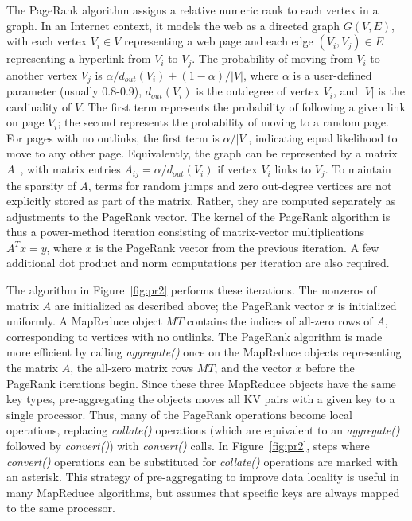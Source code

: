 The PageRank algorithm assigns a relative numeric rank to each vertex
in a graph.  In an Internet context, it models the web as a directed
graph $G(V,E)$, with each vertex $V_i \in V$ representing a web page
and each edge $(V_i, V_j) \in E$ representing a hyperlink from $V_i$
to $V_j$.  The probability of moving from $V_i$ to another vertex
$V_j$ is $\alpha/d_{out}(V_i) + (1-\alpha)/|V|$, where $\alpha$ is a
user-defined parameter (usually 0.8-0.9), $d_{out}(V_i)$ is the
outdegree of vertex $V_i$, and $|V|$ is the cardinality of $V$.  The
first term represents the probability of following a given link on
page $V_i$; the second represents the probability of moving to a
random page.  For pages with no outlinks, the first term is
$\alpha/|V|$, indicating equal likelihood to move to any other page.
Equivalently, the graph can be represented by a matrix
$A$~\cite{LangvilleMeyer05a}, with matrix entries $A_{ij} =
\alpha/d_{out}(V_i)$ if vertex $V_i$ links to $V_j$.  To maintain the
sparsity of $A$, terms for random jumps and zero out-degree vertices
are not explicitly stored as part of the matrix.  Rather, they are
computed separately as adjustments to the PageRank vector.  The kernel
of the PageRank algorithm is thus a power-method iteration consisting
of matrix-vector multiplications $A^T x=y$, where $x$ is the PageRank
vector from the previous iteration.  A few additional dot product and
norm computations per iteration are also required.

The algorithm in Figure~\ref{fig:pr2} performs these iterations.  The
nonzeros of matrix $A$ are initialized as described above; the
PageRank vector $x$ is initialized uniformly.  A MapReduce object $MT$
contains the indices of all-zero rows of $A$, corresponding to
vertices with no outlinks.  The PageRank algorithm is made more
efficient by calling {\it aggregate()} once on the MapReduce objects
representing the matrix $A$, the all-zero matrix rows $MT$, and the
vector $x$ before the PageRank iterations begin.  Since these three
MapReduce objects have the same key types, pre-aggregating the objects
moves all KV pairs with a given key to a single processor.  Thus, many
of the PageRank operations become local operations, replacing {\it
collate()} operations (which are equivalent to an {\it aggregate()}
followed by {\it convert()}) with {\it convert()} calls.  In
Figure~\ref{fig:pr2}, steps where {\it convert()} operations can be
substituted for {\it collate()} operations are marked with an
asterisk.  This strategy of pre-aggregating to improve data locality
is useful in many MapReduce algorithms, but assumes that specific keys
are always mapped to the same processor.


